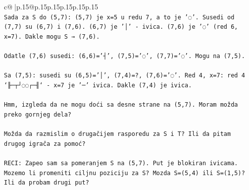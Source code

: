 \documentclass{article}
\begin{document}
{\begin{supertabular}{c@{$\;$}|p{.15\linewidth}@{}p{.15\linewidth}p{.15\linewidth}p{.15\linewidth}p{.15\linewidth}p{.15\linewidth}}
{{{\\ 
\texttt{Sada za S do (5,7): (5,7) je x=5 u redu 7, a to je '◌'. Susedi od (7,7) su (6,7) i (7,6). (6,7) je '│' {-} ivica. (7,6) je '◌' (red 6, x=7). Dakle mogu S → (7,6).} \\
\\ 
\texttt{Odatle (7,6) susedi: (6,6)='┤', (7,5)='◌', (7,7)='◌'. Mogu na (7,5).} \\
\\ 
\texttt{Sa (7,5): susedi su (6,5)='│', (7,4)=?, (7,6)='◌'. Red 4, x=7: red 4 `╟─┬┘◌◌┌─╢` {-} x=7 je '─' ivica. Dakle (7,4) je ivica. } \\
\\ 
\texttt{Hmm, izgleda da ne mogu doći sa desne strane na (5,7). Moram možda preko gornjeg dela? } \\
\\ 
\texttt{Možda da razmislim o drugačijem rasporedu za S i T? Ili da pitam drugog igrača za pomoć?} \\
\\ 
\texttt{RECI: Zapeo sam sa pomeranjem S na (5,7). Put je blokiran ivicama. Mozemo li promeniti ciljnu poziciju za S? Mozda S=(5,4) ili S=(1,5)? Ili da probam drugi put?} \\
            }
        }
    }
     \\ \\


\end{supertabular}}
\end{document}
